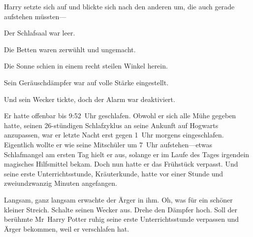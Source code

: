 Harry setzte sich auf und blickte sich nach den anderen um, die auch gerade aufstehen müssten—





Der Schlafsaal war leer.

Die Betten waren zerwühlt und ungemacht.

Die Sonne schien in einem recht steilen Winkel herein.

Sein Geräuschdämpfer war auf volle Stärke eingestellt.

Und sein Wecker tickte, doch der Alarm war deaktiviert.

Er hatte offenbar bis 9:52~Uhr geschlafen. Obwohl er sich alle Mühe gegeben hatte, seinen 26-stündigen Schlafzyklus an seine Ankunft auf Hogwarts anzupassen, war er letzte Nacht erst gegen 1~Uhr morgens eingeschlafen. Eigentlich wollte er wie seine Mitschüler um 7~Uhr aufstehen—etwas Schlafmangel am ersten Tag hielt er aus, solange er im Laufe des Tages irgendein magisches Hilfsmittel bekam. Doch nun hatte er das Frühstück verpasst. Und seine erste Unterrichtsstunde, Kräuterkunde, hatte vor einer Stunde und zweiundzwanzig Minuten angefangen.

Langsam, ganz langsam erwachte der Ärger in ihm. Oh, was für ein schöner kleiner Streich. Schalte seinen Wecker aus. Drehe den Dämpfer hoch. Soll der berühmte Mr~Harry Potter ruhig seine erste Unterrichtsstunde verpassen und Ärger bekommen, weil er verschlafen hat.

